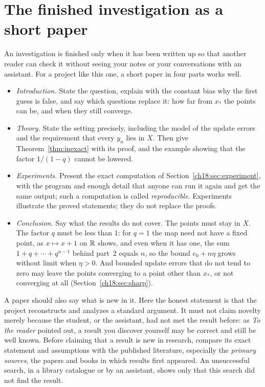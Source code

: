 \section{The finished investigation as a short paper}\label{ch18:sec:paper}
An investigation is finished only when it has been written up so that another reader can check it without seeing your notes or your conversations with an assistant. For a project like this one, a short paper in four parts works well.
\begin{itemize}
\item \emph{Introduction.} State the question, explain with the constant bias why the first guess is false, and say which questions replace it: how far from $x_*$ the points can be, and when they still converge.
\item \emph{Theory.} State the setting precisely, including the model of the update errors and the requirement that every $y_n$ lies in $X$. Then give Theorem~\ref{thm:inexact} with its proof, and the example showing that the factor $1/(1-q)$ cannot be lowered.
\item \emph{Experiments.} Present the exact computation of Section~\ref{ch18:sec:experiment}, with the program and enough detail that anyone can run it again and get the same output; such a computation is called \emph{reproducible}. Experiments illustrate the proved statements; they do not replace the proofs.
\item \emph{Conclusion.} Say what the results do not cover. The points must stay in $X$. The factor $q$ must be less than $1$: for $q=1$ the map need not have a fixed point, as $x\mapsto x+1$ on $\mathbb R$ shows, and even when it has one, the sum $1+q+\cdots+q^{n-1}$ behind part~2 equals $n$, so the bound $e_0+n\eta$ grows without limit when $\eta>0$. And bounded update errors that do not tend to zero may leave the points converging to a point other than $x_*$, or not converging at all (Section~\ref{ch18:sec:sharp}).
\end{itemize}

A paper should also say what is new in it. Here the honest statement is that the project reconstructs and analyzes a standard argument. It must not claim novelty merely because the student, or the assistant, had not met the result before: as \emph{To the reader} pointed out, a result you discover yourself may be correct and still be well known. Before claiming that a result is new in research, compare its exact statement and assumptions with the published literature, especially the \emph{primary sources}, the papers and books in which results first appeared. An unsuccessful search, in a library catalogue or by an assistant, shows only that this search did not find the result.
